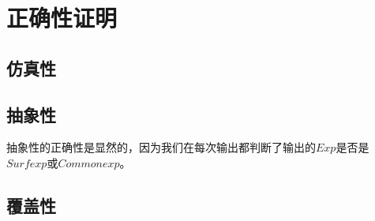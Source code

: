 \section{正确性证明}
\subsection{仿真性}

\subsection{抽象性}
抽象性的正确性是显然的，因为我们在每次输出都判断了输出的$Exp$是否是$Surfexp$或$Commonexp$。

\subsection{覆盖性}



